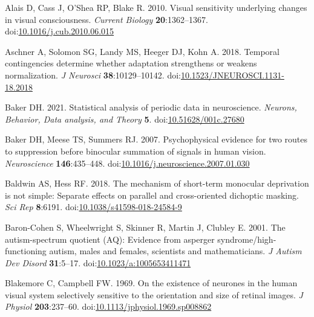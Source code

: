 \documentclass[
]{article}
\newlength{\cslhangindent}
\newlength{\cslentryspacingunit} %
\newenvironment{CSLReferences}[2] %
 {%
  \setlength{\parindent}{0pt}
  \ifodd #1
  \let\oldpar\par
  \def\par{\hangindent=\cslhangindent\oldpar}
  \fi
  \setlength{\parskip}{#2\cslentryspacingunit}
 }%
 {}
\begin{document}
\hypertarget{refs}{}
\begin{CSLReferences}{1}{0}
\leavevmode{}%
Alais D, Cass J, O'Shea RP, Blake R. 2010. Visual sensitivity underlying changes in visual consciousness. \emph{Current Biology} \textbf{20}:1362--1367. doi:\href{https://doi.org/10.1016/j.cub.2010.06.015}{10.1016/j.cub.2010.06.015}

\leavevmode{}%
Aschner A, Solomon SG, Landy MS, Heeger DJ, Kohn A. 2018. Temporal contingencies determine whether adaptation strengthens or weakens normalization. \emph{J Neurosci} \textbf{38}:10129--10142. doi:\href{https://doi.org/10.1523/JNEUROSCI.1131-18.2018}{10.1523/JNEUROSCI.1131-18.2018}

\leavevmode{}%
Baker DH. 2021. Statistical analysis of periodic data in neuroscience. \emph{Neurons, Behavior, Data analysis, and Theory} \textbf{5}. doi:\href{https://doi.org/10.51628/001c.27680}{10.51628/001c.27680}

\leavevmode{}%
Baker DH, Meese TS, Summers RJ. 2007. Psychophysical evidence for two routes to suppression before binocular summation of signals in human vision. \emph{Neuroscience} \textbf{146}:435--448. doi:\href{https://doi.org/10.1016/j.neuroscience.2007.01.030}{10.1016/j.neuroscience.2007.01.030}

\leavevmode{}%
Baldwin AS, Hess RF. 2018. The mechanism of short-term monocular deprivation is not simple: Separate effects on parallel and cross-oriented dichoptic masking. \emph{Sci Rep} \textbf{8}:6191. doi:\href{https://doi.org/10.1038/s41598-018-24584-9}{10.1038/s41598-018-24584-9}

\leavevmode{}%
Baron-Cohen S, Wheelwright S, Skinner R, Martin J, Clubley E. 2001. The autism-spectrum quotient (AQ): Evidence from asperger syndrome/high-functioning autism, males and females, scientists and mathematicians. \emph{J Autism Dev Disord} \textbf{31}:5--17. doi:\href{https://doi.org/10.1023/a:1005653411471}{10.1023/a:1005653411471}

\leavevmode{}%
Blakemore C, Campbell FW. 1969. On the existence of neurones in the human visual system selectively sensitive to the orientation and size of retinal images. \emph{J Physiol} \textbf{203}:237--60. doi:\href{https://doi.org/10.1113/jphysiol.1969.sp008862}{10.1113/jphysiol.1969.sp008862}


\end{CSLReferences}
\end{document}
